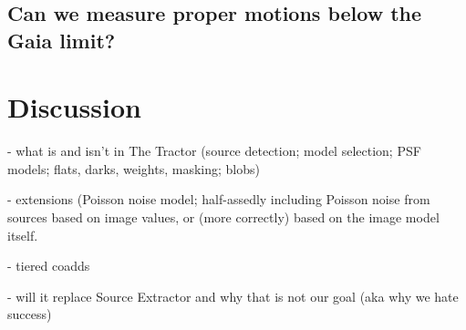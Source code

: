 \documentclass[modern, linenumbers]{aastex631}
\begin{document}
\subsection{Can we measure proper motions below the Gaia limit?}



\section{Discussion}

- what is and isn't in The Tractor (source detection; model selection; PSF models; flats, darks, weights, masking; blobs)

- extensions (Poisson noise model; half-assedly including Poisson noise from sources based on image values, or (more correctly) based on the image model itself.

- tiered coadds

- will it replace Source Extractor and why that is not our goal (aka why we hate success)



\software{%
          }


{}

\end{document}
